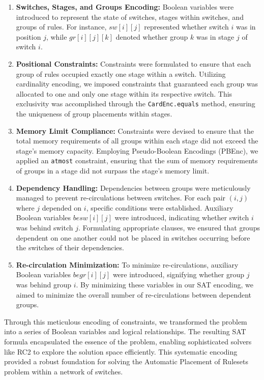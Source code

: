 \begin{enumerate}
    \item \textbf{Switches, Stages, and Groups Encoding:}
    Boolean variables were introduced to represent the state of switches, stages within switches, and groups of rules. For instance, \(sw[i][j]\) represented whether switch \(i\) was in position \(j\), while \(gr[i][j][k]\) denoted whether group \(k\) was in stage \(j\) of switch \(i\).

    \item \textbf{Positional Constraints:}
    Constraints were formulated to ensure that each group of rules occupied exactly one stage within a switch. Utilizing cardinality encoding, we imposed constraints that guaranteed each group was allocated to one and only one stage within its respective switch. This exclusivity was accomplished through the \texttt{CardEnc.equals} method, ensuring the uniqueness of group placements within stages.

    \item \textbf{Memory Limit Compliance:}
    Constraints were devised to ensure that the total memory requirements of all groups within each stage did not exceed the stage's memory capacity. Employing Pseudo-Boolean Encodings (PBEnc), we applied an \texttt{atmost} constraint, ensuring that the sum of memory requirements of groups in a stage did not surpass the stage's memory limit.

    \item \textbf{Dependency Handling:}
    Dependencies between groups were meticulously managed to prevent re-circulations between switches. For each pair \((i, j)\) where \(j\) depended on \(i\), specific conditions were established. Auxiliary Boolean variables \(besw[i][j]\) were introduced, indicating whether switch \(i\) was behind switch \(j\). Formulating appropriate clauses, we ensured that groups dependent on one another could not be placed in switches occurring before the switches of their dependencies.

    \item \textbf{Re-circulation Minimization:}
    To minimize re-circulations, auxiliary Boolean variables \(begr[i][j]\) were introduced, signifying whether group \(j\) was behind group \(i\). By minimizing these variables in our SAT encoding, we aimed to minimize the overall number of re-circulations between dependent groups.
\end{enumerate}

Through this meticulous encoding of constraints, we transformed the problem into a series of Boolean variables and logical relationships. The resulting SAT formula encapsulated the essence of the problem, enabling sophisticated solvers like RC2 to explore the solution space efficiently. This systematic encoding provided a robust foundation for solving the Automatic Placement of Rulesets problem within a network of switches.

